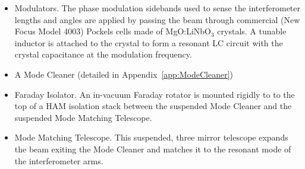 \begin{itemize}
\item   Modulators. The phase modulation sidebands used to sense the
        interferometer lengths and angles are applied by passing the
        beam through commercial (New Focus Model 4003) Pockels cells
        made of MgO:LiNbO$_3$ crystals. 
        A tunable inductor is attached to the crystal to form a resonant
        LC circuit with the crystal capacitance at the modulation
        frequency.
\item   A Mode Cleaner (detailed in Appendix~\ref{app:ModeCleaner})
\item   Faraday Isolator. An in-vacuum Faraday rotator is mounted rigidly to
        to the top of a HAM isolation stack between the suspended Mode Cleaner
        and the suspended Mode Matching Telescope.
\item   Mode Matching Telescope. This suspended, three mirror telescope expands
        the beam exiting the Mode Cleaner and matches it to the resonant mode
        of the interferometer arms.
\end{itemize}









